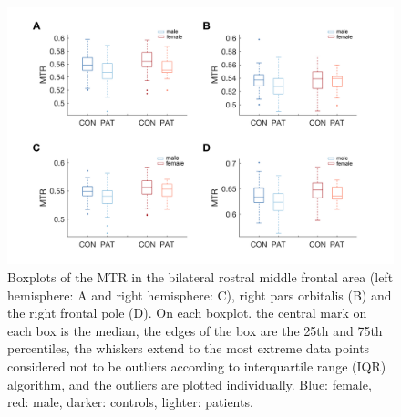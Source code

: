 \begin{refsection}
\begin{figure}[H]
\centering
  \includegraphics[width=\linewidth]{images/mtrFigS3.png}
  \caption{\small Boxplots of the MTR in the bilateral rostral middle frontal area (left hemisphere: A and right hemisphere: C), right pars orbitalis (B) and the right frontal pole (D). On each boxplot. the central mark on each box is the median, the edges of the box are the 25th and 75th percentiles, the whiskers extend to the most extreme data points considered not to be outliers according to interquartile range (IQR) algorithm, and the outliers are plotted individually. Blue: female, red: male, darker: controls, lighter: patients.}
  \label{mtrFigS3}
\end{figure}



\end{refsection}

